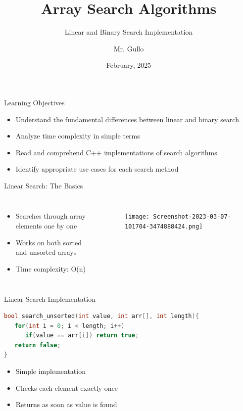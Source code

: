 \documentclass{beamer}
\title[Array Searching]{ Array Search Algorithms}
\subtitle{Linear and Binary Search Implementation}
\author[Mr. Gullo]{Mr. Gullo}
\date[Feb 2025]{February, 2025}
\begin{document}
\frame{\titlepage}

\begin{frame}{Learning Objectives}
\begin{itemize}
\item Understand the fundamental differences between linear and binary search
\item Analyze time complexity in simple terms
\item Read and comprehend C++ implementations of search algorithms
\item Identify appropriate use cases for each search method
\end{itemize}
\end{frame}

\begin{frame}{Linear Search: The Basics}
\begin{columns}
\begin{itemize}
\item Searches through array elements one by one
\item Works on both sorted and unsorted arrays
\item Time complexity: O(n)
\end{itemize}

\begin{figure}
    \centering
    \texttt{[image: Screenshot-2023-03-07-101704-3474888424.png]}
\end{figure}
\end{columns}
\end{frame}

\begin{frame}[fragile]{Linear Search Implementation}
\begin{lstlisting}[language=C++]
bool search_unsorted(int value, int arr[], int length){
   for(int i = 0; i < length; i++)
      if(value == arr[i]) return true;
   return false;
}
\end{lstlisting}
\pause

\begin{itemize}
\item Simple implementation
\item Checks each element exactly once
\item Returns as soon as value is found
\end{itemize}
\end{frame}
\end{document}
